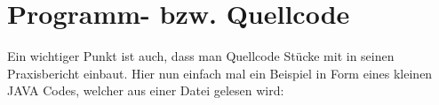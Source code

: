 \chapter{Programm- bzw. Quellcode}

Ein wichtiger Punkt ist auch, dass man Quellcode Stücke mit in seinen Praxisbericht einbaut. Hier nun einfach mal ein Beispiel in Form eines kleinen JAVA Codes, welcher aus einer Datei gelesen wird:


